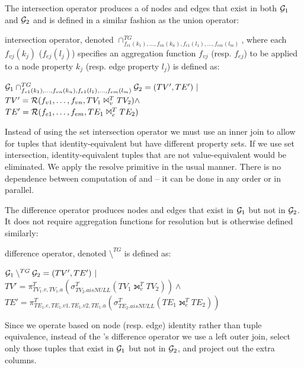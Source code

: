 The \tg intersection operator produces a \tg of nodes and edges that
exist in both $\mathcal{G}_1$ and $\mathcal{G}_2$ and is defined in a similar fashion
as the union operator:

\begin{definition}[Intersection]
\label{def:intertg}
\tg intersection operator, denoted
$\cap^{TG}_{f_{v1}(k_1),\ldots,f_{vn}(k_n),f_{e1}(l_1),\ldots,f_{em}(l_m)}$,
where each $f_{vj}(k_j)$ ($f_{ej}(l_j)$) specifies an aggregation
function $f_{vj}$ (resp. $f_{ej}$) to be applied to a node property
$k_j$ (resp. edge property $l_j$) is defined as:

$\mathcal{G}_1 \cap^{TG}_{f_{v1}(k_1),\ldots,f_{vn}(k_n),f_{e1}(l_1),\ldots,f_{em}(l_m)} \mathcal{G}_2 = (TV', TE') ~|~ $\\$TV' = \mathcal{R}(f_{v1},\ldots,f_{vn},TV_1 \Join^T_{v} TV_2) \land $\\$TE' = \mathcal{R}(f_{e1},\ldots,f_{em},TE_1 \Join^T_{e} TE_2)$
\end{definition}

Instead of using the \tra set intersection operator we must use an
inner join to allow for tuples that identity-equivalent but have
different property sets.  If we use set intersection,
identity-equivalent tuples that are not value-equivalent would be
eliminated.  We apply the resolve primitive in the usual manner.
There is no dependence between computation of \tv and \te -- it can be
done in any order or in parallel.

The difference operator produces nodes and edges that exist in
$\mathcal{G}_1$ but not in $\mathcal{G}_2$.  It does not require aggregation
functions for resolution but is otherwise defined similarly:

\begin{definition}[Difference]
\label{def:difftg}
\tg difference operator, denoted
$\setminus^{TG}$ is defined as:

$\mathcal{G}_1 \setminus^{TG} \mathcal{G}_2 = (TV', TE') ~|~ $\\$TV' = \pi^T_{TV_1.v,TV_1.a}(\sigma^T_{TV_2.a is NULL}(TV_1 \leftouterjoin^T_{v} TV_2)) \land $\\$TE' = \pi^T_{TE_1.e,TE_1.v1,TE_1.v2,TE_1.a}(\sigma^T_{TE_2.a is NULL}(TE_1 \leftouterjoin^T_{e} TE_2))$
\end{definition}

Since we operate based on node (resp. edge) identity rather than tuple
equivalence, instead of the \tra's difference operator we use a left
outer join, select only those tuples that exist in $\mathcal{G}_1$ but not in
$\mathcal{G}_2$, and project out the extra columns.

